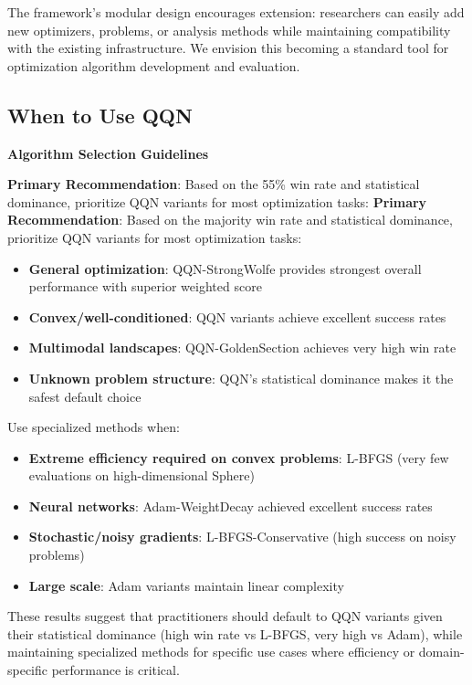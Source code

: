 The framework's modular design encourages extension: researchers can easily add new optimizers, problems, or analysis methods while maintaining compatibility with the existing infrastructure. We envision this becoming a standard tool for optimization algorithm development and evaluation.

\hypertarget{when-to-use-qqn}{%
\subsection{When to Use QQN}\label{when-to-use-qqn}}

\textbf{Algorithm Selection Guidelines}

\textbf{Primary Recommendation}: Based on the 55\% win rate and statistical dominance, prioritize QQN variants for most optimization tasks:
\textbf{Primary Recommendation}: Based on the majority win rate and statistical dominance, prioritize QQN variants for most optimization tasks:

\begin{itemize}
\tightlist
\item
  \textbf{General optimization}: QQN-StrongWolfe provides strongest overall performance with superior weighted score
\item
  \textbf{Convex/well-conditioned}: QQN variants achieve excellent success rates
\item
  \textbf{Multimodal landscapes}: QQN-GoldenSection achieves very high win rate
\item
  \textbf{Unknown problem structure}: QQN's statistical dominance makes it the safest default choice
\end{itemize}

Use specialized methods when:

\begin{itemize}
\tightlist
\item
  \textbf{Extreme efficiency required on convex problems}: L-BFGS (very few evaluations on high-dimensional Sphere)
\item
  \textbf{Neural networks}: Adam-WeightDecay achieved excellent success rates
\item
  \textbf{Stochastic/noisy gradients}: L-BFGS-Conservative (high success on noisy problems)
\item
  \textbf{Large scale}: Adam variants maintain linear complexity
\end{itemize}

These results suggest that practitioners should default to QQN variants given their statistical dominance (high win rate vs L-BFGS, very high vs Adam), while maintaining specialized methods for specific use cases where efficiency or domain-specific performance is critical.

